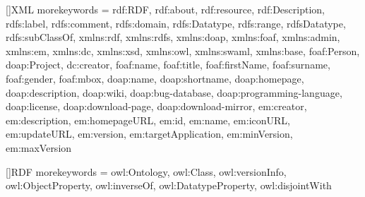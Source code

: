 {
}

\headheight 15pt

\let\OLDthebibliography=\thebibliography
\def\thebibliography#1{\OLDthebibliography{#1}%
	\addcontentsline{toc}{chapter}{\bibname}}

\renewcommand{\tablename}{Tabla}
\renewcommand{\listtablename}{Indice de tablas}




[]{XML}{%
	morekeywords = {rdf:RDF, rdf:about, rdf:resource, rdf:Description,
			rdfs:label, rdfs:comment, rdfs:domain, rdfs:Datatype,
			rdfs:range, rdfsDatatype, rdfs:subClassOf,
			xmlns:rdf, xmlns:rdfs, xmlns:doap, xmlns:foaf,
			xmlns:admin, xmlns:em, xmlns:dc, xmlns:xsd,
			xmlns:owl, xmlns:swaml, xmlns:base,
			foaf:Person, doap:Project, dc:creator,
			foaf:name, foaf:title, foaf:firstName,
			foaf:surname, foaf:gender, foaf:mbox,
			doap:name, doap:shortname, doap:homepage,
			doap:description, doap:wiki, doap:bug-database,
			doap:programming-language, doap:license, 
			doap:download-page, doap:download-mirror,
			em:creator, em:description, em:homepageURL,
			em:id, em:name, em:iconURL, em:updateURL,
			em:version, em:targetApplication, em:minVersion,
			em:maxVersion
	}
}

[]{RDF}{%
	morekeywords = {owl:Ontology, owl:Class, owl:versionInfo, 
			owl:ObjectProperty, owl:inverseOf,
			owl:DatatypeProperty, owl:disjointWith
	}
}


